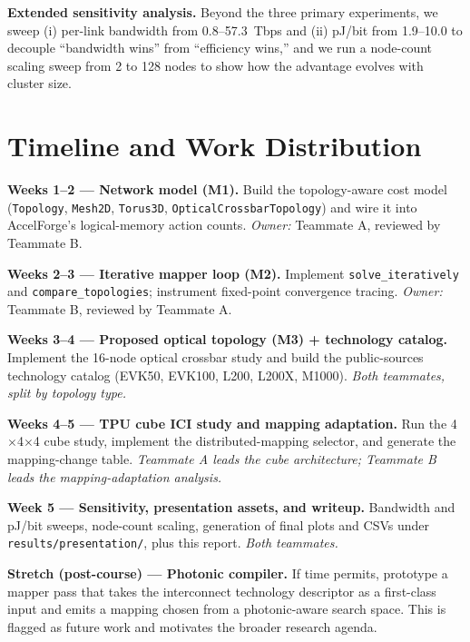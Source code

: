 \documentclass[conference,onecolumn]{IEEEtran}
\begin{document}
\textbf{Extended sensitivity analysis.}
Beyond the three primary experiments, we sweep (i) per-link bandwidth from
0.8--57.3~Tbps and (ii) pJ/bit from 1.9--10.0 to decouple ``bandwidth wins''
from ``efficiency wins,'' and we run a node-count scaling sweep from 2 to 128
nodes to show how the advantage evolves with cluster size.


\section{Timeline and Work Distribution}
\textbf{Weeks 1--2 --- Network model (M1).}
Build the topology-aware cost model (\texttt{Topology}, \texttt{Mesh2D},
\texttt{Torus3D}, \texttt{OpticalCrossbarTopology}) and wire it into
AccelForge's logical-memory action counts. \emph{Owner:} Teammate A,
reviewed by Teammate B.

\textbf{Weeks 2--3 --- Iterative mapper loop (M2).}
Implement \texttt{solve\_iteratively} and \texttt{compare\_topologies};
instrument fixed-point convergence tracing. \emph{Owner:} Teammate B,
reviewed by Teammate A.

\textbf{Weeks 3--4 --- Proposed optical topology (M3) + technology catalog.}
Implement the 16-node optical crossbar study and build the public-sources
technology catalog (EVK50, EVK100, L200, L200X, M1000). \emph{Both teammates,
split by topology type.}

\textbf{Weeks 4--5 --- TPU cube ICI study and mapping adaptation.}
Run the 4$\times$4$\times$4 cube study, implement the distributed-mapping
selector, and generate the mapping-change table. \emph{Teammate A leads the
cube architecture; Teammate B leads the mapping-adaptation analysis.}

\textbf{Week 5 --- Sensitivity, presentation assets, and writeup.}
Bandwidth and pJ/bit sweeps, node-count scaling, generation of final plots
and CSVs under \texttt{results/presentation/}, plus this report. \emph{Both
teammates.}

\textbf{Stretch (post-course) --- Photonic compiler.}
If time permits, prototype a mapper pass that takes the interconnect
technology descriptor as a first-class input and emits a mapping chosen from
a photonic-aware search space. This is flagged as future work and motivates
the broader research agenda.
\end{document}
